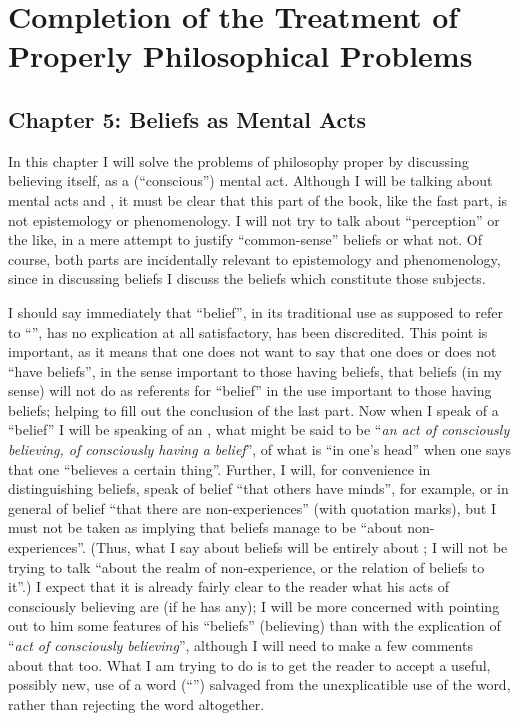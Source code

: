 \clearpage
\section{Completion of the Treatment of Properly Philosophical Problems}
\subsection[Chapter 5: Beliefs as Mental Acts][Beliefs as Mental Acts]{Chapter 5: Beliefs as Mental Acts}

In this chapter I will solve the problems of philosophy proper by 
discussing believing itself, as a (\enquote{conscious}) mental act. Although I will be 
talking about mental acts and , it must be clear that this part of 
the book, like the fast part, is not epistemology or phenomenology. I will 
not try to talk about \enquote{perception} or the like, in a mere attempt to justify 
\enquote{common-sense} beliefs or what not. Of course, both parts are incidentally 
relevant to epistemology and phenomenology, since in discussing beliefs I 
discuss the beliefs which constitute those subjects. 

I should say immediately that \enquote{belief}, in its traditional use as supposed 
to refer to \enquote{}, has no explication at all satisfactory, has been discredited. 
This point is important, as it means that one does not want to say that one 
does or does not \enquote{have beliefs}, in the sense important to those having 
beliefs, that beliefs (in my sense) will not do as referents for \enquote{belief} in the 
use important to those having beliefs; helping to fill out the conclusion of 
the last part. Now when I speak of a \enquote{belief} I will be speaking of an 
, what might be said to be \enquote{\emph{an act of consciously believing, of 
consciously having a belief}}, of what is \enquote{in one's head} when one says that 
one \enquote{believes a certain thing}. Further, I will, for convenience in 
distinguishing beliefs, speak of belief \enquote{that others have minds}, for example, 
or in general of belief \enquote{that there are non-experiences} (with quotation 
marks), but I must not be taken as implying that beliefs manage to be 
\enquote{about non-experiences}. (Thus, what I say about beliefs will be entirely 
about ; I will not be trying to talk \enquote{about the realm of 
non-experience, or the relation of beliefs to it}.) I expect that it is already 
fairly clear to the reader what his acts of consciously believing are (if he has 
any); I will be more concerned with pointing out to him some features of his 
\enquote{beliefs} (believing) than with the explication of \enquote{\emph{act of consciously 
believing}}, although I will need to make a few comments about that too. 
What I am trying to do is to get the reader to accept a useful, possibly new, 
use of a word (\enquote{}) salvaged from the unexplicatible use of the word, 
rather than rejecting the word altogether. 

